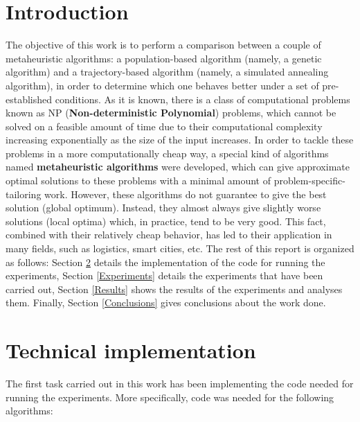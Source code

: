 \documentclass{article}[12pt]
\begin{document}
	\section{Introduction}
	The objective of this work is to perform a comparison between a couple of metaheuristic algorithms: a population-based algorithm (namely, a genetic algorithm) and a trajectory-based algorithm (namely, a simulated annealing algorithm), in order to determine which one behaves better under a set of pre-established conditions.
\bigbreak
	As it is known, there is a class of computational problems known as NP (\textbf{Non-deterministic Polynomial}) problems, which cannot be solved on a feasible amount of time due to their computational complexity increasing exponentially as the size of the input increases. In order to tackle these problems in a more computationally cheap way, a special kind of algorithms named \textbf{metaheuristic algorithms} were developed, which can give approximate optimal solutions to these problems with a minimal amount of problem-specific-tailoring work. However, these algorithms do not guarantee to give the best solution (global optimum). Instead, they almost always give slightly worse solutions (local optima) which, in practice, tend to be very good. This fact, combined with their relatively cheap behavior, has led to their application in many fields, such as logistics, smart cities, etc.
\bigbreak
	The rest of this report is organized as follows: Section \ref{Implementation} details the implementation of the code for running the experiments, Section \ref{Experiments} details the experiments that have been carried out, Section \ref{Results} shows the results of the experiments and analyses them. Finally, Section \ref{Conclusions} gives conclusions about the work done.
	
	\section{Technical implementation} \label{Implementation}
	
	The first task carried out in this work has been implementing the code needed for running the experiments. More specifically, code was needed for the following algorithms:
	
\end{document}
